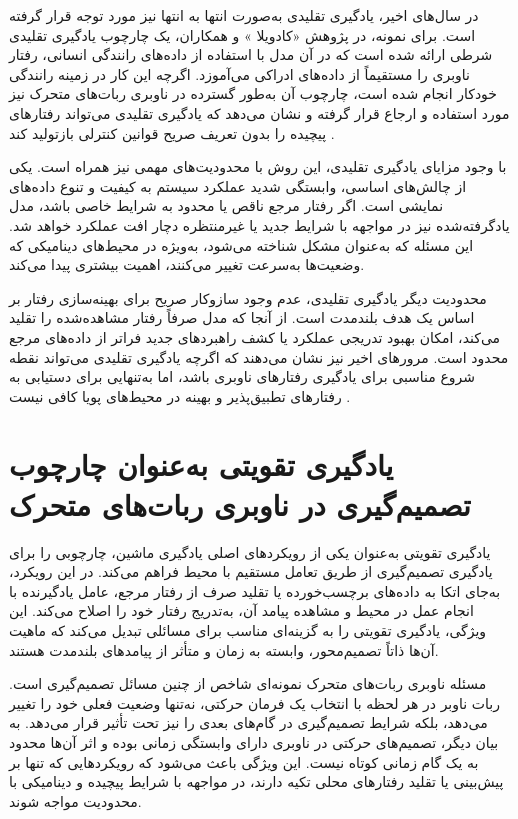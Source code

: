 در سال‌های اخیر، یادگیری تقلیدی به‌صورت انتها به انتها نیز مورد توجه قرار گرفته است. برای نمونه، در پژوهش «کادویلا%
 »%
  و همکاران، یک چارچوب یادگیری تقلیدی شرطی ارائه شده است که در آن مدل با استفاده از داده‌های رانندگی انسانی، رفتار ناوبری را مستقیماً از داده‌های ادراکی می‌آموزد. اگرچه این کار در زمینه رانندگی خودکار انجام شده است، چارچوب آن به‌طور گسترده در ناوبری ربات‌های متحرک نیز مورد استفاده و ارجاع قرار گرفته و نشان می‌دهد که یادگیری تقلیدی می‌تواند رفتارهای پیچیده را بدون تعریف صریح قوانین کنترلی بازتولید کند%
\cite{codevilla2018endtoend}.

با وجود مزایای یادگیری تقلیدی، این روش با محدودیت‌های مهمی نیز همراه است. یکی از چالش‌های اساسی، وابستگی شدید عملکرد سیستم به کیفیت و تنوع داده‌های نمایشی است. اگر رفتار مرجع ناقص یا محدود به شرایط خاصی باشد، مدل یادگرفته‌شده نیز در مواجهه با شرایط جدید یا غیرمنتظره دچار افت عملکرد خواهد شد. این مسئله که به‌عنوان مشکل  شناخته می‌شود، به‌ویژه در محیط‌های دینامیکی که وضعیت‌ها به‌سرعت تغییر می‌کنند، اهمیت بیشتری پیدا می‌کند.

محدودیت دیگر یادگیری تقلیدی، عدم وجود سازوکار صریح برای بهینه‌سازی رفتار بر اساس یک هدف بلندمدت است. از آنجا که مدل صرفاً رفتار مشاهده‌شده را تقلید می‌کند، امکان بهبود تدریجی عملکرد یا کشف راهبردهای جدید فراتر از داده‌های مرجع محدود است. مرورهای اخیر نیز نشان می‌دهند که اگرچه یادگیری تقلیدی می‌تواند نقطه شروع مناسبی برای یادگیری رفتارهای ناوبری باشد، اما به‌تنهایی برای دستیابی به رفتارهای تطبیق‌پذیر و بهینه در محیط‌های پویا کافی نیست%
\cite{Zhu2021}.


\section{یادگیری تقویتی به‌عنوان چارچوب تصمیم‌گیری در ناوبری ربات‌های متحرک}

یادگیری تقویتی به‌عنوان یکی از رویکردهای اصلی یادگیری ماشین، چارچوبی را برای یادگیری تصمیم‌گیری از طریق تعامل مستقیم با محیط فراهم می‌کند. در این رویکرد، به‌جای اتکا به داده‌های برچسب‌خورده یا تقلید صرف از رفتار مرجع، عامل یادگیرنده با انجام عمل در محیط و مشاهده پیامد آن، به‌تدریج رفتار خود را اصلاح می‌کند. این ویژگی، یادگیری تقویتی را به گزینه‌ای مناسب برای مسائلی تبدیل می‌کند که ماهیت آن‌ها ذاتاً تصمیم‌محور، وابسته به زمان و متأثر از پیامدهای بلندمدت هستند.

مسئله ناوبری ربات‌های متحرک نمونه‌ای شاخص از چنین مسائل تصمیم‌گیری است. ربات ناوبر در هر لحظه با انتخاب یک فرمان حرکتی، نه‌تنها وضعیت فعلی خود را تغییر می‌دهد، بلکه شرایط تصمیم‌گیری در گام‌های بعدی را نیز تحت تأثیر قرار می‌دهد. به بیان دیگر، تصمیم‌های حرکتی در ناوبری دارای وابستگی زمانی بوده و اثر آن‌ها محدود به یک گام زمانی کوتاه نیست. این ویژگی باعث می‌شود که رویکردهایی که تنها بر پیش‌بینی یا تقلید رفتارهای محلی تکیه دارند، در مواجهه با شرایط پیچیده و دینامیکی با محدودیت مواجه شوند.

